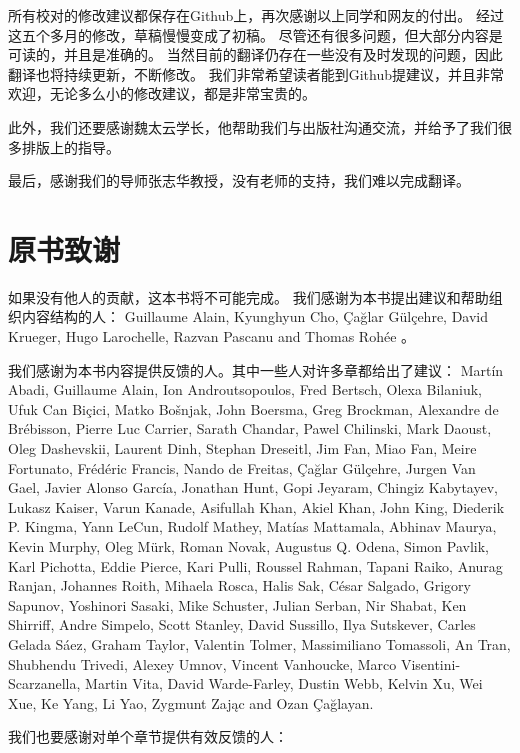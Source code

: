 所有校对的修改建议都保存在Github上，再次感谢以上同学和网友的付出。
经过这五个多月的修改，草稿慢慢变成了初稿。
尽管还有很多问题，但大部分内容是可读的，并且是准确的。
当然目前的翻译仍存在一些没有及时发现的问题，因此翻译也将持续更新，不断修改。
我们非常希望读者能到Github提建议，并且非常欢迎，无论多么小的修改建议，都是非常宝贵的。

此外，我们还要感谢魏太云学长，他帮助我们与出版社沟通交流，并给予了我们很多排版上的指导。

最后，感谢我们的导师张志华教授，没有老师的支持，我们难以完成翻译。


\chapter*{原书致谢}

如果没有他人的贡献，这本书将不可能完成。
我们感谢为本书提出建议和帮助组织内容结构的人：
Guillaume Alain, Kyunghyun Cho, \c{C}a\u{g}lar G\"ul\c{c}ehre, David Krueger, Hugo Larochelle, Razvan Pascanu and Thomas Roh\'ee 。


我们感谢为本书内容提供反馈的人。其中一些人对许多章都给出了建议：
Mart\'in Abadi, Guillaume Alain, Ion Androutsopoulos, Fred Bertsch, Olexa Bilaniuk, Ufuk Can Biçici, Matko Bo\v{s}njak, John Boersma, Greg Brockman, Alexandre de Brébisson, Pierre Luc Carrier, Sarath Chandar, Pawel Chilinski, Mark Daoust, Oleg Dashevskii, Laurent Dinh, Stephan Dreseitl, Jim Fan, Miao Fan, Meire Fortunato, Fr\'ed\'eric Francis, Nando de Freitas, \c{C}a\u{g}lar G\"ul\c{c}ehre, Jurgen Van Gael, Javier Alonso Garc\'ia, Jonathan Hunt, Gopi Jeyaram, Chingiz Kabytayev, Lukasz Kaiser, Varun Kanade, Asifullah Khan, Akiel Khan, John King, Diederik P. Kingma, Yann LeCun, Rudolf Mathey, Matías Mattamala, Abhinav Maurya, Kevin Murphy, Oleg Mürk, Roman Novak, Augustus Q. Odena, Simon Pavlik, Karl Pichotta, Eddie Pierce, Kari Pulli, Roussel Rahman, Tapani Raiko, Anurag Ranjan, Johannes Roith, Mihaela Rosca, Halis Sak, César Salgado, Grigory Sapunov, Yoshinori Sasaki, Mike Schuster, Julian Serban, Nir Shabat, Ken Shirriff, Andre Simpelo, Scott Stanley, David Sussillo, Ilya Sutskever, Carles Gelada Sáez, Graham Taylor, Valentin Tolmer, Massimiliano Tomassoli, An Tran, Shubhendu Trivedi, Alexey Umnov, Vincent Vanhoucke, Marco Visentini-Scarzanella, Martin Vita, David Warde-Farley, Dustin Webb, Kelvin Xu, Wei Xue, Ke Yang, Li Yao, Zygmunt Zaj\k{a}c and Ozan \c{C}a\u{g}layan.


我们也要感谢对单个章节提供有效反馈的人：


